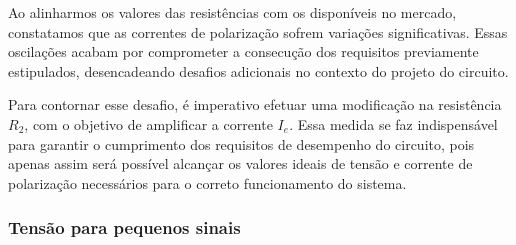 Ao alinharmos os valores das resistências com os disponíveis no mercado, constatamos que as correntes de polarização sofrem variações significativas. Essas oscilações acabam por comprometer a consecução dos requisitos previamente estipulados, desencadeando desafios adicionais no contexto do projeto do circuito.

Para contornar esse desafio, é imperativo efetuar uma modificação na resistência $R_2$, com o objetivo de amplificar a corrente $I_e$. Essa medida se faz indispensável para garantir o cumprimento dos requisitos de desempenho do circuito, pois apenas assim será possível alcançar os valores ideais de tensão e corrente de polarização necessários para o correto funcionamento do sistema.

\subsubsection{Tensão para pequenos sinais}